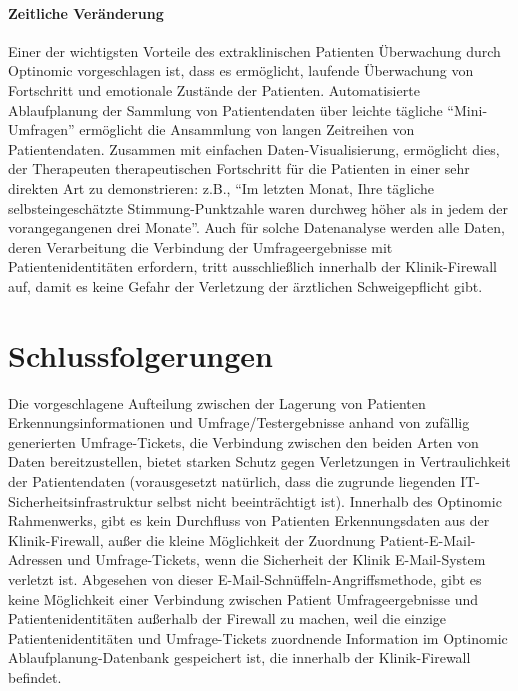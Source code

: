 \documentclass[DIV=calc,paper=a4,fontsize=11pt,twocolumn]{scrartcl}
\begin{document}
\paragraph{Zeitliche Veränderung}

Einer der wichtigsten Vorteile des extraklinischen Patienten
Überwachung durch Optinomic vorgeschlagen ist, dass es ermöglicht,
laufende Überwachung von Fortschritt und emotionale Zustände der
Patienten. Automatisierte Ablaufplanung der Sammlung von
Patientendaten über leichte tägliche ``Mini-Umfragen'' ermöglicht die
Ansammlung von langen Zeitreihen von Patientendaten.  Zusammen mit
einfachen Daten-Visualisierung, ermöglicht dies, der Therapeuten
therapeutischen Fortschritt für die Patienten in einer sehr direkten
Art zu demonstrieren: z.B., ``Im letzten Monat, Ihre tägliche
selbsteingeschätzte Stimmung-Punktzahle waren durchweg höher als in
jedem der vorangegangenen drei Monate''. Auch für solche Datenanalyse
werden alle Daten, deren Verarbeitung die Verbindung der
Umfrageergebnisse mit Patientenidentitäten erfordern, tritt
ausschließlich innerhalb der Klinik-Firewall auf, damit es keine
Gefahr der Verletzung der ärztlichen Schweigepflicht gibt.


\section*{Schlussfolgerungen}

Die vorgeschlagene Aufteilung zwischen der Lagerung von Patienten
Erkennungsinformationen und Umfrage/Testergebnisse anhand von zufällig
generierten Umfrage-Tickets, die Verbindung zwischen den beiden Arten
von Daten bereitzustellen, bietet starken Schutz gegen Verletzungen in
Vertraulichkeit der Patientendaten (vorausgesetzt natürlich, dass die
zugrunde liegenden IT-Sicherheitsinfrastruktur selbst nicht
beeinträchtigt ist). Innerhalb des Optinomic Rahmenwerks, gibt es kein
Durchfluss von Patienten Erkennungsdaten aus der Klinik-Firewall,
außer die kleine Möglichkeit der Zuordnung Patient-E-Mail-Adressen und
Umfrage-Tickets, wenn die Sicherheit der Klinik E-Mail-System verletzt
ist.  Abgesehen von dieser E-Mail-Schnüffeln-Angriffsmethode, gibt es
keine Möglichkeit einer Verbindung zwischen Patient Umfrageergebnisse
und Patientenidentitäten außerhalb der Firewall zu machen, weil die
einzige Patientenidentitäten und Umfrage-Tickets zuordnende
Information im Optinomic Ablaufplanung-Datenbank gespeichert ist, die
innerhalb der Klinik-Firewall befindet.
\end{document}
